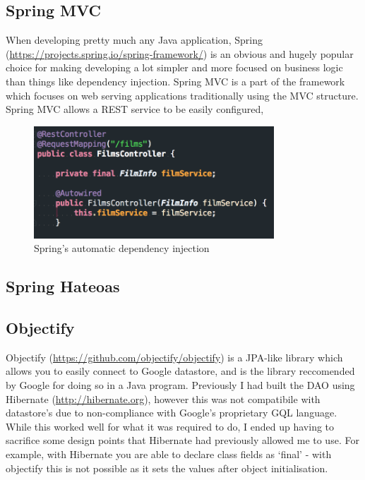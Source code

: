 \documentclass[12pt]{article}
\begin{document}
  \subsection{Spring MVC}
    When developing pretty much any Java application, Spring (\url{https://projects.spring.io/spring-framework/}) is an obvious and hugely popular choice for making developing a lot simpler and more focused on business logic than things like dependency injection. Spring MVC is a part of the framework which focuses on web serving applications traditionally using the MVC structure. Spring MVC allows a REST \citep{fielding2000architectural} service to be easily configured,

    \begin{figure}[ht]
      \centering
      \includegraphics[width=9cm]{autowired-components}
      \caption{Spring's automatic dependency injection}
      \label{fig:spring-autowired-components}
    \end{figure}

  \subsection{Spring Hateoas}

  \subsection{Objectify}
    Objectify (\url{https://github.com/objectify/objectify}) is a JPA-like library which allows you to easily connect to Google datastore, and is the library reccomended by Google for doing so in a Java program. Previously I had built the DAO using Hibernate (\url{http://hibernate.org}), however this was not compatibile with datastore's due to non-compliance with Google's proprietary GQL language. While this worked well for what it was required to do, I ended up having to sacrifice some design points that Hibernate had previously allowed me to use. For example, with Hibernate you are able to declare class fields as ‘final’ - with objectify this is not possible as it sets the values after object initialisation.
\end{document}
